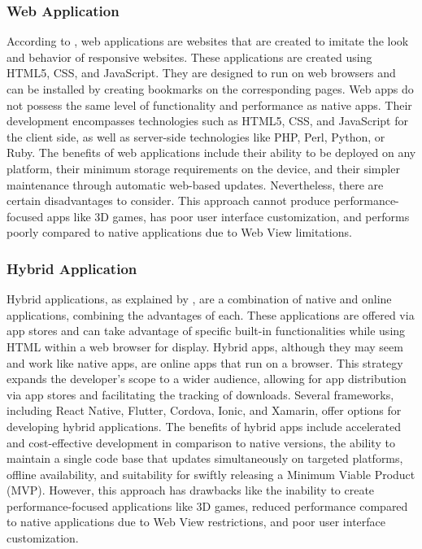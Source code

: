\subsubsection{Web Application}
According to \textcite{syeed21}, web applications are websites that are created to imitate the look and behavior of responsive websites. These applications are created using HTML5, CSS, and JavaScript. They are designed to run on web browsers and can be installed by creating bookmarks on the corresponding pages. Web apps do not possess the same level of functionality and performance as native apps. Their development encompasses technologies such as HTML5, CSS, and JavaScript for the client side, as well as server-side technologies like PHP, Perl, Python, or Ruby. The benefits of web applications include their ability to be deployed on any platform, their minimum storage requirements on the device, and their simpler maintenance through automatic web-based updates. Nevertheless, there are certain disadvantages to consider. This approach cannot produce performance-focused apps like 3D games, has poor user interface customization, and performs poorly compared to native applications due to Web View limitations.

\subsubsection{Hybrid Application}
Hybrid applications, as explained by \textcite{syeed21}, are a combination of native and online applications, combining the advantages of each. These applications are offered via app stores and can take advantage of specific built-in functionalities while using HTML within a web browser for display. Hybrid apps, although they may seem and work like native apps, are online apps that run on a browser. This strategy expands the developer's scope to a wider audience, allowing for app distribution via app stores and facilitating the tracking of downloads. Several frameworks, including React Native, Flutter, Cordova, Ionic, and Xamarin, offer options for developing hybrid applications. The benefits of hybrid apps include accelerated and cost-effective development in comparison to native versions, the ability to maintain a single code base that updates simultaneously on targeted platforms, offline availability, and suitability for swiftly releasing a Minimum Viable Product (MVP). However, this approach has drawbacks like the inability to create performance-focused applications like 3D games, reduced performance compared to native applications due to Web View restrictions, and poor user interface customization.

